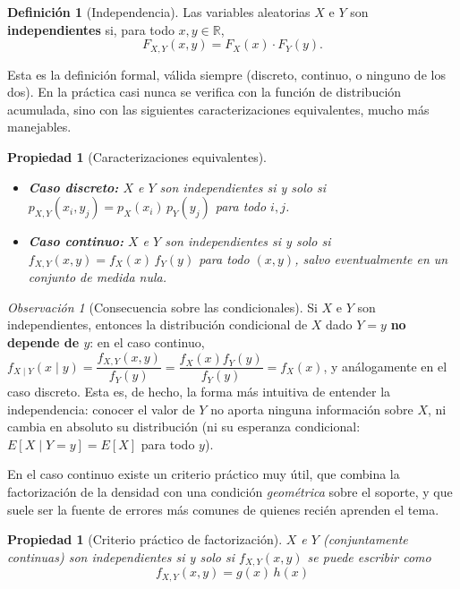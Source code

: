\documentclass[11pt,a4paper]{article}
\theoremstyle{plain}
\newtheorem{propiedad}[teorema]{Propiedad}
\theoremstyle{definition}
\newtheorem{definicion}[teorema]{Definición}
\theoremstyle{remark}
\newtheorem{observacion}[teorema]{Observación}
\begin{document}
\begin{definicion}[Independencia]
Las variables aleatorias $X$ e $Y$ son \textbf{independientes} si, para todo $x,y\in\mathbb R$,
\[
F_{X,Y}(x,y) = F_X(x)\cdot F_Y(y).
\]
\end{definicion}

Esta es la definición formal, válida siempre (discreto, continuo, o ninguno de los dos). En la práctica casi nunca se verifica con la función de distribución acumulada, sino con las siguientes caracterizaciones equivalentes, mucho más manejables.

\begin{propiedad}[Caracterizaciones equivalentes]\label{prop:caracterizaciones-independencia}
\begin{itemize}
\item \textbf{Caso discreto:} $X$ e $Y$ son independientes si y solo si $p_{X,Y}(x_i,y_j) = p_X(x_i)\,p_Y(y_j)$ para todo $i,j$.
\item \textbf{Caso continuo:} $X$ e $Y$ son independientes si y solo si $f_{X,Y}(x,y) = f_X(x)\,f_Y(y)$ para todo $(x,y)$, salvo eventualmente en un conjunto de medida nula.
\end{itemize}
\end{propiedad}

\begin{observacion}[Consecuencia sobre las condicionales]
Si $X$ e $Y$ son independientes, entonces la distribución condicional de $X$ dado $Y=y$ \textbf{no depende de $y$}: en el caso continuo, $f_{X\mid Y}(x\mid y) = \dfrac{f_{X,Y}(x,y)}{f_Y(y)} = \dfrac{f_X(x)f_Y(y)}{f_Y(y)} = f_X(x)$, y análogamente en el caso discreto. Esta es, de hecho, la forma más intuitiva de entender la independencia: conocer el valor de $Y$ no aporta ninguna información sobre $X$, ni cambia en absoluto su distribución (ni su esperanza condicional: $E[X\mid Y=y]=E[X]$ para todo $y$).
\end{observacion}

En el caso continuo existe un criterio práctico muy útil, que combina la factorización de la densidad con una condición \emph{geométrica} sobre el soporte, y que suele ser la fuente de errores más comunes de quienes recién aprenden el tema.

\begin{propiedad}[Criterio práctico de factorización]\label{prop:criterio-factorizacion}
$X$ e $Y$ (conjuntamente continuas) son independientes si y solo si $f_{X,Y}(x,y)$ se puede escribir como
\[
f_{X,Y}(x,y) = g(x)\,h(x)
\]
\end{propiedad}
\end{document}

